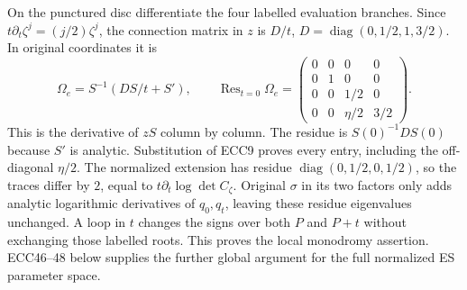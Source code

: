 \documentclass[11pt]{article}
\newcommand{\diag}{\operatorname{diag}}
\providecommand{\Res}{\operatorname{Res}}
\begin{document}
On the punctured disc differentiate the four labelled evaluation
branches. Since $t\partial_t\zeta^j=(j/2)\zeta^j$, the connection matrix
in $z$ is $D/t$, $D=\diag(0,1/2,1,3/2)$. In original coordinates it is
\begin{equation}
 \Omega_e=S^{-1}(DS/t+S'),\qquad
 \Res_{t=0}\Omega_e=
 \begin{pmatrix}0&0&0&0\\0&1&0&0\\
 0&0&1/2&0\\0&0&\eta/2&3/2\end{pmatrix}.
 \tag{ECC15}
\end{equation}
This is the derivative of $zS$ column by column. The residue is
$S(0)^{-1}DS(0)$ because $S'$ is analytic. Substitution of ECC9 proves
every entry, including the off-diagonal $\eta/2$. The normalized extension
has residue $\diag(0,1/2,0,1/2)$, so the traces differ by $2$, equal to
$t\partial_t\log\det C_\zeta$. Original $\sigma$ in its two factors
only adds analytic logarithmic derivatives of $q_0,q_t$, leaving these
residue eigenvalues unchanged. A loop in $t$ changes the signs over both
$P$ and $P+t$ without exchanging those labelled roots. This proves the
local monodromy assertion. ECC46--48 below supplies the further global
argument for the full normalized ES parameter space.
\end{document}
